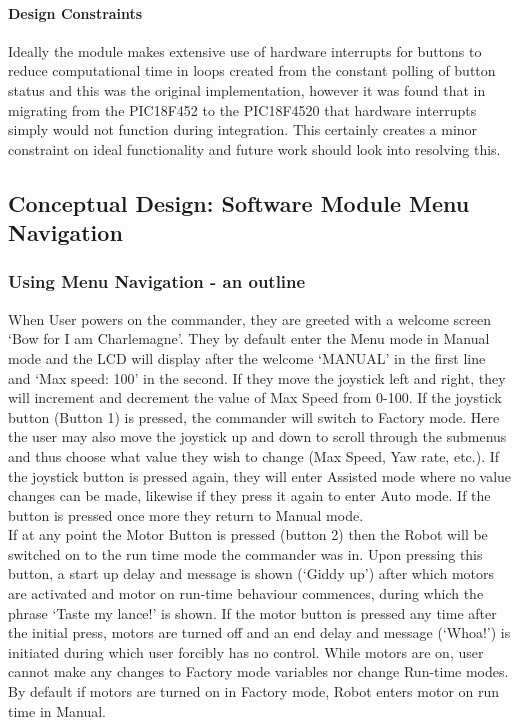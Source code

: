	\paragraph{Design Constraints}
	Ideally the module makes extensive use of hardware interrupts for buttons to reduce computational time in loops created from the constant polling of button status and this was the original implementation, however it was found that in migrating from the PIC18F452 to the PIC18F4520 that hardware interrupts simply would not function during integration. This certainly creates a minor constraint on ideal functionality and future work should look into resolving this.
	
	\subsection{Conceptual Design: Software Module Menu Navigation}

	
	\subsubsection{Using Menu Navigation - an outline}
	When User powers on the commander, they are greeted with a welcome screen `Bow for I am Charlemagne'. They by default enter the Menu mode in Manual mode and the LCD will display after the welcome `MANUAL' in the first line and `Max speed: 100' in the second. If they move the joystick left and right, they will increment and decrement the value of Max Speed from 0-100. If the joystick button (Button 1) is pressed, the commander will switch to Factory mode. Here the user may also move the joystick up and down to scroll through the submenus and thus choose what value they wish to change (Max Speed, Yaw rate, etc.). If the joystick button is pressed again, they will enter Assisted mode where no value changes can be made, likewise if they press it again to enter Auto mode. If the button is pressed once more they return to Manual mode.\\
	
	If at any point the Motor Button is pressed (button 2) then the Robot will be switched on to the run time mode the commander was in. Upon pressing this button, a start up delay and message is shown (`Giddy up') after which motors are activated and motor on run-time behaviour commences, during which the phrase `Taste my lance!' is shown. If the motor button is pressed any time after the initial press, motors are turned off and an end delay and message (`Whoa!') is initiated during which user forcibly has no control. While motors are on, user cannot make any changes to Factory mode variables nor change Run-time modes. By default if motors are turned on in Factory mode, Robot enters motor on run time in Manual.
	
